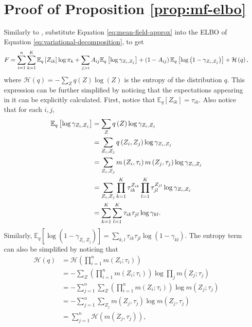 \documentclass[../../main.tex]{subfiles} %
\begin{document}
	
\section{Proof of Proposition \ref{prop:mf-elbo}} \label{sec:proof-mf-elbo}

Similarly to \cite{mariadassou}, substitute Equation 
\eqref{eq:mean-field-approx} into the ELBO of Equation 
\eqref{eq:variational-decomposition}, to get
\begin{dmath}
	F = \sum_{i=1}^n \sum_{k=1}^K \esp[q]{Z_{ik}} \log{\pi_k} +
	\sum_{j > i} A_{ij} \esp[q]{\log{\gamma_{Z_i, Z_j}}} + \left( 1 -
	A_{ij} \right) \esp[q]{\log{\left(1-\gamma_{Z_i, Z_j}\right)}} +
	\mathcal H \left(q\right),
	\label{eq:rough-elbo}
\end{dmath}
where \(\mathcal H (q) = -\sum_Z q(Z) \log(Z) \) is the entropy of the
distribution $q$. This expression can be further simplified by noticing that 
the expectations appearing in it can be explicitly calculated. First, notice 
that $\mathbb E_q [Z_{ik}] = \tau_{ik}$. Also notice that for each \(i, j\),
\begin{align*}
	\esp[q]{\log{\gamma_{Z_i, Z_j}}} &= \sum_Z q \left(Z \right)
	\log{\gamma_{Z_i, Z_j}} \\
	&= \sum_{Z_i, Z_j} q \left( Z_i, Z_j \right) \log{\gamma_{Z_i, Z_j}} \\
	&= \sum_{Z_i, Z_j} m \left( Z_i, \tau_i \right) m \left( Z_j, \tau_j
	\right) \log{\gamma_{Z_i, Z_j}} \\
	&= \sum_{Z_i, Z_j} \prod_{k=1}^K \tau_{ik}^{Z_{ik}} \prod_{l=1}^K
	\tau_{jl}^{Z_{jl}} \log{\gamma_{Z_i, Z_j}} \\
	&= \sum_{k=1}^K \sum_{l = 1}^K \tau_{ik} \tau_{jl}
	\log{\gamma_{kl}}.
\end{align*}
Similarly, \(\mathbb E_{q} [\log{(1 - \gamma_{Z_i, Z_j})}] = \sum_{k,l}
\tau_{ik} \tau_{jl} \log{(1 - \gamma_{kl})}\). The entropy term can also be 
simplified by noticing that
\begin{align*}
	\mathcal H \left( q \right) &= \mathcal H \left( \prod_{i=1}^n 
	m \left( Z_i; \tau_i \right) \right) \\
	&= - \sum_Z \left( \prod_{i=1}^n m \left( Z_i; \tau_i \right) \right)
	\log \prod_{j} m \left( Z_j; \tau_j \right) \\
	&= - \sum_{j=1}^n \sum_{Z} \left( \prod_{i=1}^n m \left( Z_i; \tau_i 
	\right) \right) \log m \left( Z_j; \tau_j \right) \\
	&= - \sum_{j=1}^n \sum_{Z_j} m \left( Z_j, \tau_j \right) \log{m \left(
		Z_j, \tau_j \right)} \\
	&= \sum_{j=1}^n \mathcal H \left( m \left( Z_j, \tau_j \right) \right),
\end{align*}
\end{document}
